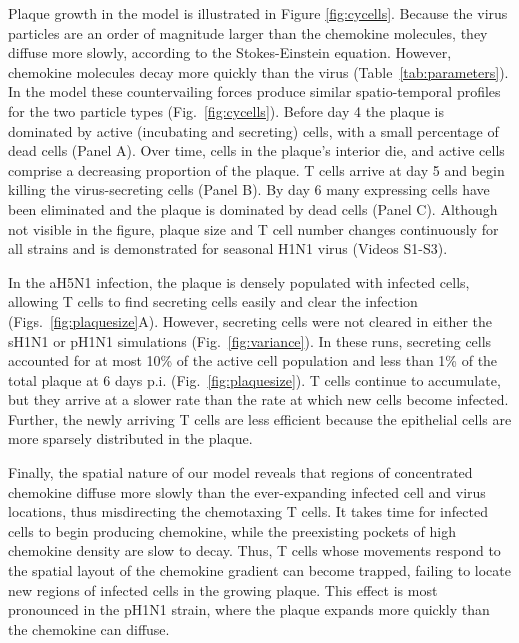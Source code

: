 \documentclass[10pt]{article}
\begin{document}
Plaque growth in the model is illustrated in Figure \ref{fig:cycells}.  Because the virus particles are an order of magnitude larger than the chemokine molecules, they diffuse more slowly, according to the Stokes-Einstein equation.  However, chemokine molecules decay more quickly than the virus (Table~\ref{tab:parameters}).  In the model these countervailing forces produce similar spatio-temporal profiles for the two particle types (Fig.~\ref{fig:cycells}). Before day 4 the plaque is dominated by active (incubating and secreting) cells, with a small percentage of dead cells (Panel A). Over time, cells in the plaque's interior die, and active cells comprise a decreasing proportion of the plaque. T cells arrive at day 5 and begin killing the virus-secreting cells (Panel B). By day 6 many expressing cells have been eliminated and the plaque is dominated by dead cells (Panel C).  Although not visible in the figure, plaque size and T cell number changes continuously for all strains and is demonstrated for seasonal H1N1 virus (Videos S1-S3).

In the aH5N1 infection, the plaque is densely populated with infected cells, allowing T cells to find secreting cells easily and clear the infection (Figs.~\ref{fig:plaquesize}A).  However, secreting cells were not cleared in either the sH1N1 or pH1N1 simulations (Fig.~\ref{fig:variance}).  In these runs, secreting cells accounted for at most 10\% of the active cell population and less than 1\% of the total plaque at 6 days p.i. (Fig.~\ref{fig:plaquesize}).  T cells continue to accumulate, but they arrive at a slower rate than the rate at which new cells become infected.  Further, the newly arriving T cells are less efficient because the epithelial cells are more sparsely distributed in the plaque.

Finally, the spatial nature of our model reveals that regions of concentrated chemokine diffuse more slowly than the ever-expanding infected cell and virus locations, thus misdirecting the chemotaxing T cells.  It takes time for infected cells to begin producing chemokine, while the preexisting pockets of high chemokine density are slow to decay.  Thus, T cells whose movements respond to the spatial layout of the chemokine gradient can become trapped, failing to locate new regions of infected cells in the growing plaque.  This effect is most pronounced in the pH1N1 strain, where the plaque expands more quickly than the chemokine can diffuse.

\end{document}
